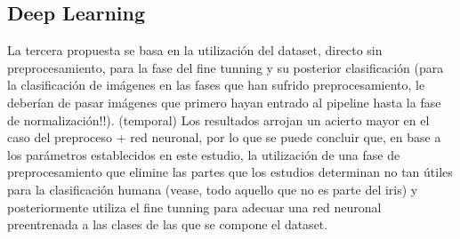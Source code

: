 \subsection{Deep Learning}

La tercera propuesta se basa en la utilización del dataset, directo sin preprocesamiento, para la fase del fine tunning y su posterior clasificación (para la clasificación de imágenes en las fases
que han sufrido preprocesamiento, le deberían de pasar imágenes que primero hayan entrado al pipeline hasta la fase de normalización!!).
(temporal) Los resultados arrojan un acierto mayor en el caso del preproceso + red neuronal, por lo que se puede concluir que, en base a los parámetros establecidos en este estudio, la utilización de 
una fase de preprocesamiento que elimine las partes que los estudios determinan no tan útiles para la clasificación humana (vease, todo aquello que no es parte del iris)
 y posteriormente utiliza el fine tunning para adecuar una red neuronal preentrenada a las clases de las que se compone el dataset.

